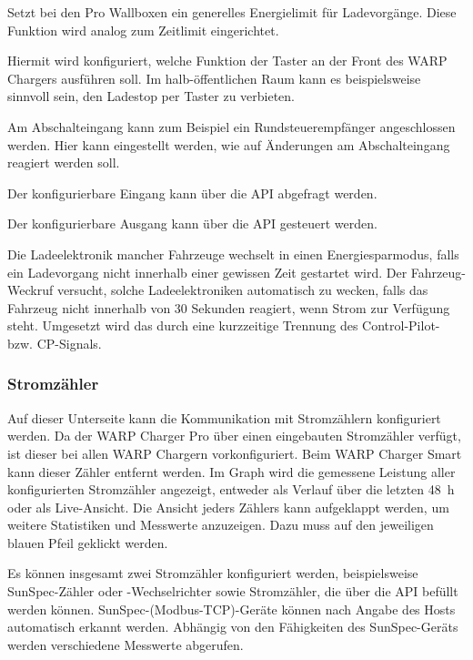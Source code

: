 \documentclass[a4paper,10pt]{article}
\begin{document}
\begin{multicols*}{2}
\begin{description}[labelindent=0.5cm, leftmargin=0.5cm]
     \item[Energielimit] Setzt bei den Pro Wallboxen ein generelles Energielimit für Ladevorgänge. Diese Funktion wird analog zum Zeitlimit eingerichtet.
     \item[Tastereinstellung] Hiermit wird konfiguriert, welche Funktion der Taster an der Front
     des WARP Chargers ausführen soll. Im halb-öffentlichen Raum kann es beispielsweise sinnvoll sein,
     den Ladestop per Taster zu verbieten.
     \item[Abschalteingang] Am Abschalteingang kann zum Beispiel ein Rundsteuerempfänger angeschlossen werden.
     Hier kann eingestellt werden, wie auf Änderungen am Abschalteingang reagiert werden soll.
     \item[Konfigurierbarer Eingang] Der konfigurierbare Eingang kann über die API abgefragt werden.
     \item[Konfigurierbarer Ausgang] Der konfigurierbare Ausgang kann über die API gesteuert werden.
     \item[Fahrzeug-Weckruf] Die Ladeelektronik mancher Fahrzeuge wechselt in
	 einen Energiesparmodus, falls ein Ladevorgang nicht innerhalb einer
	 gewissen Zeit gestartet wird. Der Fahrzeug-Weckruf versucht, solche Ladeelektroniken automatisch zu wecken, falls das Fahrzeug nicht innerhalb von 30 Sekunden reagiert, wenn Strom zur Verfügung steht. Umgesetzt wird das durch eine kurzzeitige Trennung des Control-Pilot- bzw. CP-Signals.
    \end{description}

    \subsubsection{Stromzähler}
    Auf dieser Unterseite kann die Kommunikation mit Stromzählern konfiguriert werden.
    Da der WARP Charger Pro über einen eingebauten Stromzähler verfügt, ist dieser bei allen WARP Chargern vorkonfiguriert.
    Beim WARP Charger Smart kann dieser Zähler entfernt werden.
    Im Graph wird die gemessene Leistung aller konfigurierten Stromzähler
	angezeigt, entweder als Verlauf über die letzten \SI{48}{\hour} oder als
	Live-Ansicht. Die Ansicht jeders Zählers kann aufgeklappt werden, um weitere Statistiken und Messwerte anzuzeigen. Dazu muss auf den
	jeweiligen blauen Pfeil geklickt werden.

    Es können insgesamt zwei Stromzähler konfiguriert werden, beispielsweise SunSpec-Zähler oder -Wechselrichter
    sowie Stromzähler, die über die API befüllt werden können. SunSpec-(Modbus-TCP)-Geräte können nach Angabe des Hosts
    automatisch erkannt werden. Abhängig von den Fähigkeiten des SunSpec-Geräts werden verschiedene Messwerte abgerufen.


\end{multicols*}
\end{document}

